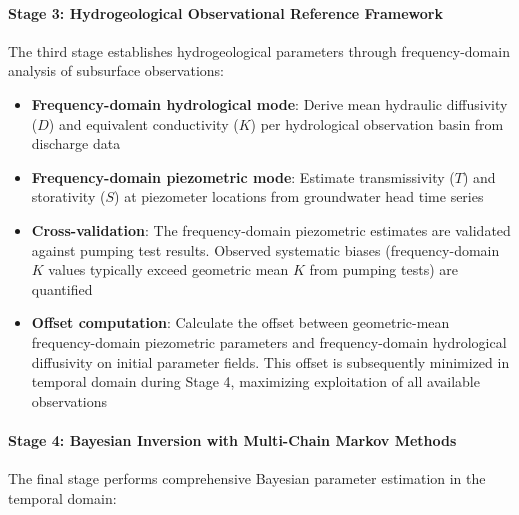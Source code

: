 \paragraph{Stage 3: Hydrogeological Observational Reference Framework}

The third stage establishes hydrogeological parameters through frequency-domain analysis of subsurface observations:

\begin{itemize}
\item \textbf{Frequency-domain hydrological mode}: Derive mean hydraulic diffusivity ($D$) and equivalent conductivity ($K$) per hydrological observation basin from discharge data

\item \textbf{Frequency-domain piezometric mode}: Estimate transmissivity ($T$) and storativity ($S$) at piezometer locations from groundwater head time series

\item \textbf{Cross-validation}: The frequency-domain piezometric estimates are validated against pumping test results. Observed systematic biases (frequency-domain $K$ values typically exceed geometric mean $K$ from pumping tests) are quantified

\item \textbf{Offset computation}: Calculate the offset between geometric-mean frequency-domain piezometric parameters and frequency-domain hydrological diffusivity on initial parameter fields. This offset is subsequently minimized in temporal domain during Stage 4, maximizing exploitation of all available observations
\end{itemize}

\paragraph{Stage 4: Bayesian Inversion with Multi-Chain Markov Methods}

The final stage performs comprehensive Bayesian parameter estimation in the temporal domain:

